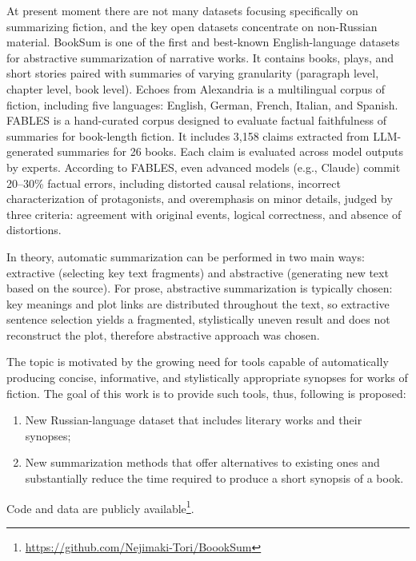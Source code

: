 \documentclass{superfri}
\begin{document}
At present moment there are not many datasets focusing specifically on summarizing fiction, and the key open datasets concentrate on non-Russian material.
BookSum \cite{BookSum} is one of the first and best-known English-language datasets for abstractive summarization of narrative works. 
It contains books, plays, and short stories paired with summaries of varying granularity (paragraph level, chapter level, book level).
Echoes from Alexandria \cite{alexandria} is a multilingual corpus of fiction, including five languages: English, German, French, Italian, and Spanish.
FABLES \cite{fables} is a hand-curated corpus designed to evaluate factual faithfulness of summaries for book-length fiction.
It includes 3,158 claims extracted from LLM-generated summaries for 26 books.
Each claim is evaluated across model outputs by experts.
According to FABLES, even advanced models (e.g., Claude) commit 20–30\% factual errors, including distorted
causal relations, incorrect characterization of protagonists, and overemphasis on minor details,
judged by three criteria: agreement with original events, logical correctness, and absence of distortions.

In theory, automatic summarization can be performed in two main ways: extractive (selecting key text fragments) and abstractive (generating new text based on the source).
For prose, abstractive summarization is typically chosen:
key meanings and plot links are distributed throughout the text, so extractive sentence selection yields a fragmented,
stylistically uneven result and does not reconstruct the plot, therefore abstractive approach was chosen.

The topic is motivated by the growing need for tools capable of automatically producing concise, informative, and stylistically appropriate synopses for works of fiction.
The goal of this work is to provide such tools, thus, following is proposed:
\begin{enumerate}
  \item New Russian-language dataset that includes literary works and their synopses;
  \item New summarization methods that offer alternatives to existing ones and substantially reduce the time required to produce a short synopsis of a book.
\end{enumerate}

Code and data are publicly available\footnote{\label{git}\url{https://github.com/Nejimaki-Tori/BoookSum}}.

\end{document}
